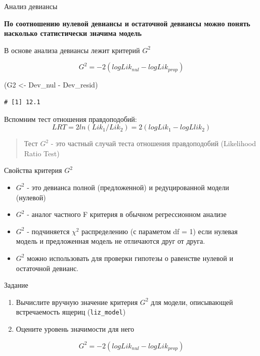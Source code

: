 \documentclass[ignorenonframetext,]{beamer}
\newenvironment{Shaded}{\begin{snugshade}}{\end{snugshade}}
\newcommand{\StringTok}[1]{\textcolor[rgb]{0.31,0.60,0.02}{{#1}}}
\newcommand{\NormalTok}[1]{{#1}}
\providecommand{\tightlist}{%
\setlength{\itemsep}{0pt}\setlength{\parskip}{0pt}}
\begin{document}
\begin{frame}[fragile]{Анализ девиансы}

\textbf{По соотношению нулевой девиансы и остаточной девиансы можно
понять насколько статистически значима модель}

В основе анализа девиансы лежит критерий \(G^2\)

\[ G^2 = -2(logLik_{nul} - logLik_{prop})\]

\begin{Shaded}
\begin{Highlighting}[]
\NormalTok{(G2 <-}\StringTok{ }\NormalTok{Dev_nul -}\StringTok{ }\NormalTok{Dev_resid)}
\end{Highlighting}
\end{Shaded}

\begin{verbatim}
# [1] 12.1
\end{verbatim}

Вспомним тест отношения правдоподобий:
\[ LRT = 2ln(Lik_1/Lik_2) = 2(logLik_1 - logLlik_2)\]

\begin{quote}
Тест \(G^2\) - это частный случай теста отношения правдоподобий
(Likelihood Ratio Test)
\end{quote}

\end{frame}

\begin{frame}{Свойства критерия \(G^2\)}

\begin{itemize}[<+->]
\tightlist
\item
  \(G^2\) - это девианса полной (предложенной) и редуцированной модели
  (нулевой)\\
\item
  \(G^2\) - аналог частного F критерия в обычном регрессионном анализе\\
\item
  \(G^2\) - подчиняется \(\chi^2\) распределению (с параметом df = 1)
  если нулевая модель и предложенная модель не отличаются друг от друга.
\item
  \(G^2\) можно использовать для проверки гипотезы о равенстве нулевой и
  остаточной девианс.
\end{itemize}

\end{frame}

\begin{frame}[fragile]{Задание}

\begin{enumerate}
\def\labelenumi{\arabic{enumi}.}
\tightlist
\item
  Вычислите вручную значение критерия \(G^2\) для модели, описывающей
  встречаемость ящериц (\texttt{liz\_model})
\item
  Оцените уровень значимости для него
\end{enumerate}

\[ G^2 = -2(logLik_{nul} - logLik_{prop})\]

\end{frame}
\end{document}
